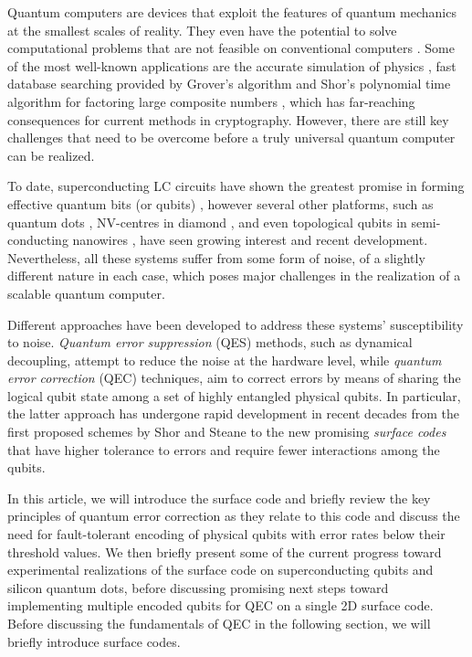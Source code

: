 Quantum computers are devices that exploit the features of quantum mechanics at
the smallest scales of reality. They even have the potential to solve
computational problems that are not feasible on conventional computers
\cite{nielsen_chuang_2010}. Some of the most well-known applications are the
accurate simulation of physics \cite{feynman82_simul_physic_with_comput}, fast
database searching provided by Grover's algorithm \cite{Grover_1996} and Shor's
polynomial time algorithm for factoring large composite numbers
\cite{Shor_1997}, which has far-reaching consequences for current methods in
cryptography. However, there are still key challenges that need to
be overcome before a truly universal quantum computer can be realized.

To date, superconducting LC circuits have shown the greatest promise in forming
effective quantum bits (or qubits) \cite{Rol_2019}
\cite{barends14_super_quant_circuit_at_surfac}, however several other platforms,
such as quantum dots \cite{huang19_fidel_bench_two_qubit_gates_silic}
\cite{Lawrie_2020}, NV-centres in diamond \cite{Taminiau_2014}, and even
topological qubits in semi-conducting nanowires \cite{Mourik_2012}, have seen
growing interest and recent development. Nevertheless, all these systems suffer
from some form of noise, of a slightly different nature in each case, which
poses major challenges in the realization of a scalable quantum computer.

Different approaches have been developed to address these systems'
susceptibility to noise. \textit{Quantum error suppression} (QES) methods, such
as dynamical decoupling, attempt to reduce the noise at the hardware level,
while \textit{quantum error correction} (QEC) techniques, aim to correct errors
by means of sharing the logical qubit state among a set of highly entangled
physical qubits. In particular, the latter approach has undergone rapid
development in recent decades from the first proposed schemes by Shor
\cite{Shor_1995_QEC} and Steane \cite{Steane_1996_QEC} to the new promising
\textit{surface codes} \cite{fowler12_surfac_codes} that have higher tolerance
to errors and require fewer interactions among the qubits.

In this article, we will introduce the surface code and briefly review the key
principles of quantum error correction as they relate to this code and discuss
the need for fault-tolerant encoding of physical qubits with error rates below
their threshold values. We then briefly present some of the current progress
toward experimental realizations of the surface code on superconducting qubits
and silicon quantum dots, before discussing promising next steps toward
implementing multiple encoded qubits for QEC on a single 2D surface code.
Before discussing the fundamentals of QEC in the following section, we
will briefly introduce surface codes.

